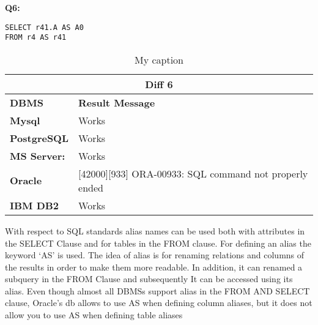 \begin{mdframed}[backgroundcolor=gray!20] 
\textbf{Q6:}
\begin{lstlisting}
SELECT r41.A AS A0
FROM r4 AS r41
\end{lstlisting}
\end{mdframed}

\begin{table}[h]
\centering
\caption{My caption}
\label{my-label}
\begin{tabular}{|p{2cm}|p{12cm}|}
\hline
\multicolumn{2}{|c|}{\textbf{Diff 6}}                                                                       \\ \hline
\textbf{DBMS}                              & \textbf{Result Message}                                        \\ \hline
{\color[HTML]{333333} \textbf{Mysql}}      & {\color[HTML]{333333} Works}                                   \\ \hline
{\color[HTML]{333333} \textbf{PostgreSQL}} & {\color[HTML]{333333} Works}                                   \\ \hline
{\color[HTML]{333333} \textbf{MS Server:}} & {\color[HTML]{333333} Works}                                   \\ \hline
\textbf{Oracle}                            & {[}42000{]}{[}933{]} ORA-00933: SQL command not properly ended \\ \hline
\textbf{IBM DB2}                           & Works                                                          \\ \hline
\end{tabular}
\end{table}


With respect to SQL standards alias names can be used both with attributes in the SELECT Clause and for tables in the FROM clause. For defining an alias the keyword ‘AS’ is used. The idea of alias is for renaming relations and columns of the results in order to make them more readable. In addition, it can renamed a subquery in the FROM Clause and subsequently It can be accessed using its alias. Even though almost all DBMSs support alias in the FROM AND SELECT clause, Oracle’s db  allows to use AS when defining column aliases, but it does not allow you to use AS when defining table aliases 




